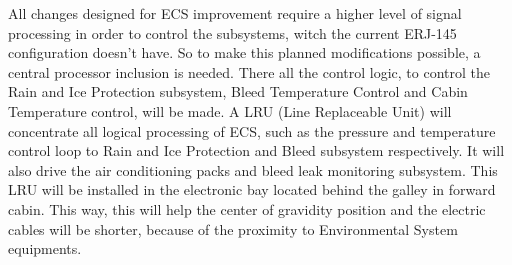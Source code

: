 ﻿All changes designed for ECS improvement require a higher level of signal processing in order to control the subsystems, witch the current ERJ-145 configuration doesn't have. So to make this planned modifications possible, a central processor inclusion is needed. There all the control logic, to control the Rain and Ice Protection subsystem, Bleed Temperature Control and Cabin Temperature control, will be made.
A LRU (Line Replaceable Unit) will concentrate all logical processing of ECS, such as the pressure and temperature control loop to Rain and Ice Protection and Bleed subsystem respectively. It will also drive the air conditioning packs and bleed leak monitoring subsystem. This LRU will be installed in the electronic bay located behind the galley in forward cabin. This way, this will help the center of gravidity position and the electric cables will be shorter, because of the proximity to Environmental System equipments.
